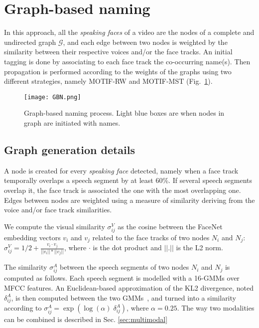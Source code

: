 \section{Graph-based naming}
\label{sec:graph}

In this approach, all the \textit{speaking faces} of a video are the nodes of a complete and undirected graph $\mathcal{G}$, and each edge between two nodes is weighted by the similarity between their respective voices and/or the face tracks.
An initial tagging is done by associating to each face track the co-occurring name(s). Then propagation is performed according to the weights of the graphs using two different strategies, namely MOTIF-RW and MOTIF-MST (Fig.~\ref{fig:gbn}).

\begin{figure}[!htb]
 \centering
 \texttt{[image: GBN.png]}
\vspace*{-5mm}
 \caption{Graph-based naming process. Light blue boxes are when nodes in graph are initiated with names.}
\vspace*{-5mm}
 \label{fig:gbn}
\end{figure}

\subsection{Graph generation details}
\label{ssec:graph_gen}
A node is created for every \textit{speaking face} detected, namely when a face track temporally overlaps a speech segment by at least 60\%. If several speech segments overlap it, the face track is associated the one with the most overlapping one.
%
Edges between nodes are weighted using a measure of similarity deriving from the voice and/or face track similarities.

We compute the visual similarity $\sigma^V_{ij}$ as the cosine between the FaceNet embedding vectors $v_i$ and $v_j$ related to the face tracks of two nodes $N_i$ and $N_j$: $\sigma^V_{ij}=1/2+\frac{v_i\cdot v_j}{||v_i||*||v_j||}$, where $\cdot$ is the dot product and $||.||$ is the L2 norm.

The similarity $\sigma^A_{ij}$ between the speech segments of two nodes  $N_i$ and $N_j$ is computed as follows. Each speech segment is modelled with a 16-GMMs over MFCC features. An Euclidean-based approximation of the KL2 divergence, noted $\delta^A_{ij}$, is then computed between the two GMMs~\cite{Ben}, and turned into a similarity according to $\sigma^A_{ij}=\exp(\log{(\alpha)} \; \delta^A_{ij})$, where $\alpha = 0.25$.
%
The way two modalities can be combined is described in Sec. \ref{sec:multimodal}

